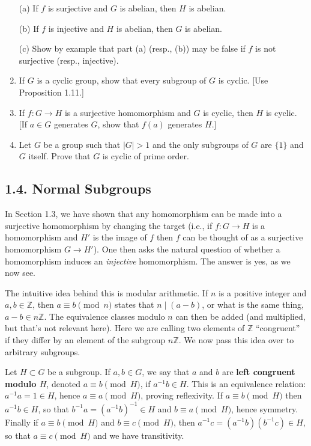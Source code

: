 \documentclass[leqno]{book}
\begin{document}
\begin{enumerate}
(a) If $f$ is surjective and $G$ is abelian, then $H$ is abelian.

(b) If $f$ is injective and $H$ is abelian, then $G$ is abelian.

(c) Show by example that part (a) (resp., (b)) may be false if $f$ is not surjective (resp., injective).

\item If $G$ is a cyclic group, show that every subgroup of $G$ is cyclic.  [Use Proposition 1.11.]

\item If $f:G\to H$ is a surjective homomorphism and $G$ is cyclic, then $H$ is cyclic.  [If $a\in G$ generates $G$, show that $f(a)$ generates $H$.]

\item Let $G$ be a group such that $|G|>1$ and the only subgroups of $G$ are $\{1\}$ and $G$ itself.  Prove that $G$ is cyclic of prime order.
\end{enumerate}

\subsection*{1.4. Normal Subgroups}
In Section 1.3, we have shown that any homomorphism can be made into a surjective homomorphism by changing the target (i.e., if $f:G\to H$ is a homomorphism and $H'$ is the image of $f$ then $f$ can be thought of as a surjective homomorphism $G\to H'$).  One then asks the natural question of whether a homomorphism induces an \emph{injective} homomorphism.  The answer is yes, as we now see.

The intuitive idea behind this is modular arithmetic.  If $n$ is a positive integer and $a,b\in\mathbb Z$, then $a\equiv b\pmod n$ states that $n\mid(a-b)$, or what is the same thing, $a-b\in n\mathbb Z$.  The equivalence classes modulo $n$ can then be added (and multiplied, but that's not relevant here).  Here we are calling two elements of $\mathbb Z$ ``congruent'' if they differ by an element of the subgroup $n\mathbb Z$.  We now pass this idea over to arbitrary subgroups.

Let $H\subset G$ be a subgroup.  If $a,b\in G$, we say that $a$ and $b$ are \textbf{left congruent modulo $H$}, denoted $a\equiv b\pmod H$, if $a^{-1}b\in H$.  This is an equivalence relation: $a^{-1}a=1\in H$, hence $a\equiv a\pmod H$, proving reflexivity.  If $a\equiv b\pmod H$ then $a^{-1}b\in H$, so that $b^{-1}a=(a^{-1}b)^{-1}\in H$ and $b\equiv a\pmod H$, hence symmetry.  Finally if $a\equiv b\pmod H$ and $b\equiv c\pmod H$, then $a^{-1}c=(a^{-1}b)(b^{-1}c)\in H$, so that $a\equiv c\pmod H$ and we have transitivity.
\end{document}
